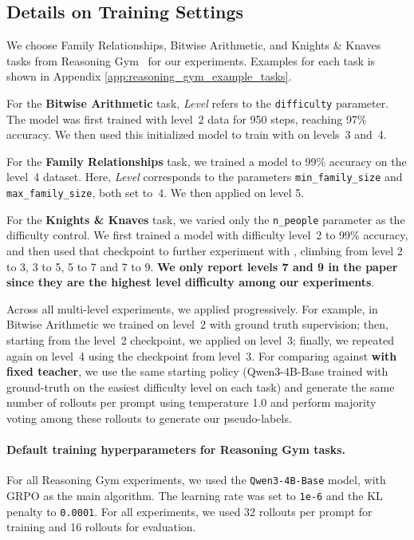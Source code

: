 \subsection{Details on Training Settings}
\label{app:training_hparam_details}

We choose Family Relationships, Bitwise Arithmetic, and Knights \& Knaves \citep{xie2024memorization} tasks from Reasoning Gym~\citep{stojanovski2025reasoninggymreasoningenvironments} for our experiments. Examples for each task is shown in Appendix \ref{app:reasoning_gym_example_tasks}. 

For the \textbf{Bitwise Arithmetic} task, \emph{Level} refers to the \texttt{difficulty} parameter. The model was first trained with level~2 data for 950 steps, reaching 97\% accuracy. We then used this initialized model to train with \algo{} on levels~3 and~4. 

For the \textbf{Family Relationships} task, we trained a model to 99\% accuracy on the level~4 dataset. Here, \emph{Level} corresponds to the parameters \texttt{min\_family\_size} and \texttt{max\_family\_size}, both set to~4. We then applied \algo{} on level 5. 

For the \textbf{Knights \& Knaves} task, we varied only the \texttt{n\_people} parameter as the difficulty control. We first trained a model with difficulty level~2 to 99\% accuracy, and then used that checkpoint to further experiment with \algo{}, climbing from level 2 to 3, 3 to 5, 5 to 7 and 7 to 9. \textbf{We only report levels 7 and 9 in the paper since they are the highest level difficulty among our experiments}. 

Across all multi-level experiments, we applied \algo{} progressively. For example, in Bitwise Arithmetic we trained on level~2 with ground truth supervision; then, starting from the level~2 checkpoint, we applied \algo{} on level~3; finally, we repeated \algo{} again on level~4 using the checkpoint from level~3. For comparing against \textbf{\algo{} with fixed teacher}, we use the same starting policy (Qwen3-4B-Base trained with ground-truth on the easiest difficulty level on each task) and generate the same number of rollouts per prompt using temperature 1.0 and perform majority voting among these rollouts to generate our pseudo-labels.

\paragraph{Default training hyperparameters for Reasoning Gym tasks.} For all Reasoning Gym experiments, we used the \texttt{Qwen3-4B-Base} model, with GRPO as the main algorithm. The learning rate was set to \texttt{1e-6} and the KL penalty to \texttt{0.0001}. For all experiments, we used 32 rollouts per prompt for training and 16 rollouts for evaluation.

